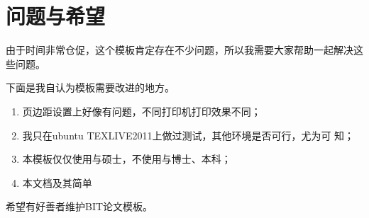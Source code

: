

\chapter{问题与希望}
\label{chap:needsomehelp}

由于时间非常仓促，这个模板肯定存在不少问题，所以我需要大家帮助一起解决这
些问题。

下面是我自认为模板需要改进的地方。
\begin{enumerate}
\item \inv 页边距设置上好像有问题，不同打印机打印效果不同；
\item \inv 我只在ubuntu TEXLIVE2011上做过测试，其他环境是否可行，尤为可
  知；
\item \inv 本模板仅仅使用与硕士，不使用与博士、本科；
\item \inv 本文档及其简单
\end{enumerate}

{\heiti 希望有好善者维护BIT论文模板。}


